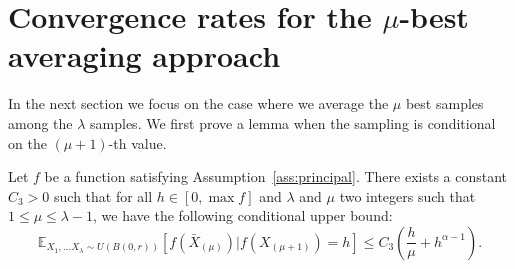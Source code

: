 
\section{Convergence rates for the $\mu$-best averaging approach}
\label{sec:mubestrate}
In the next section we focus on the case where we average the $\mu$ best samples among the $\lambda$ samples.  We first prove a lemma when the sampling is conditional on the $(\mu+1)$-th value.
\begin{lemma} 
\label{lem:condit-upper} 
Let $f$ be a function satisfying Assumption~\ref{ass:principal}. There exists a constant $C_3>0$ such that for all $h\in[0,\max f]$ and $\lambda$ and $\mu$ two integers such that $1\leq \mu \leq \lambda-1$, we have the following conditional upper bound:
\[
\mathbb{E}_{X_{1},...X_{\lambda}\sim U(B(0,r))}\left[f(\bar{X}_{(\mu)})|f(X_{(\mu+1)})=h\right]\le C_3\left(\frac{h}{\mu}+h^{\alpha-1}\right).
\]


\end{lemma} 
